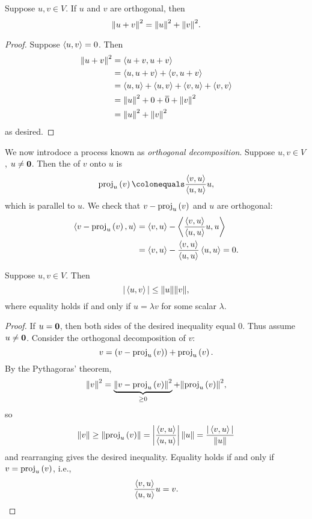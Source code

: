 \begin{lemma}
Suppose $u,v\in V$. If $u$ and $v$ are orthogonal, then
\begin{equation}
\norm{u+v}^2=\norm{u}^2+\norm{v}^2.
\end{equation}
\end{lemma}

\begin{proof}
Suppose $\left\langle u,v\right\rangle=0$. Then
\begin{align*}
\norm{u+v}^2
&=\left\langle u+v,u+v\right\rangle\\
&=\left\langle u,u+v\right\rangle+\left\langle v,u+v\right\rangle\\
&=\left\langle u,u\right\rangle+\left\langle u,v\right\rangle+\left\langle v,u\right\rangle+\left\langle v,v\right\rangle\\
&=\norm{u}^2+0+\overline{0}+\norm{v}^2\\
&=\norm{u}^2+\norm{v}^2
\end{align*}
as desired.
\end{proof}

We now introdoce a process known as \emph{orthogonal decomposition}.
Suppose $u,v\in V$, $u\neq\vb{0}$.
Then the  of $v$ onto $u$ is
\begin{equation}
\proj{u}{v}\colonequals\frac{\angbrac{v,u}}{\angbrac{u,u}}u,
\end{equation}
which is parallel to $u$. We check that $v-\mathrm{proj}_{u}\left({v}\right)$ and $u$ are orthogonal:
\begin{align*}
\left\langle v-\mathrm{proj}_{u}\left({v}\right),u\right\rangle
&=\left\langle v,u\right\rangle-\left\langle\frac{\left\langle v,u\right\rangle}{\left\langle u,u\right\rangle}u,u\right\rangle\\
&=\left\langle v,u\right\rangle-\frac{\left\langle v,u\right\rangle}{\left\langle u,u\right\rangle}\left\langle u,u\right\rangle=0.
\end{align*}

\begin{lemma}
Suppose $u,v\in V$. Then
\begin{equation}
|\left\langle u,v\right\rangle|\le\norm{u}\norm{v},
\end{equation}
where equality holds if and only if $u=\lambda v$ for some scalar $\lambda$.
\end{lemma}

\begin{proof}
If $u=\vb{0}$, then both sides of the desired inequality equal $0$. Thus assume $u\neq\vb{0}$. Consider the orthogonal decomposition of $v$:
\[v=(v-\mathrm{proj}_{u}\left({v}\right))+\mathrm{proj}_{u}\left({v}\right).\]
By the Pythagoras' theorem,
\[\norm{v}^2=\underbrace{\norm{v-\mathrm{proj}_{u}\left({v}\right)}^2}_{\ge0}+\norm{\mathrm{proj}_{u}\left({v}\right)}^2,\]
so
\[\norm{v}\ge\norm{\mathrm{proj}_{u}\left({v}\right)}
=\left|\frac{\left\langle v,u\right\rangle}{\left\langle u,u\right\rangle}\right|\norm{u}
=\frac{|\left\langle v,u\right\rangle|}{\norm{u}}\]
and rearranging gives the desired inequality. 
Equality holds if and only if $v=\mathrm{proj}_{u}\left({v}\right)$, i.e.,
\[\frac{\left\langle v,u\right\rangle}{\left\langle u,u\right\rangle}u=v.\]
\end{proof}

